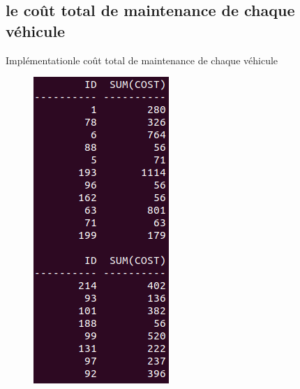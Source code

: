 \documentclass[usenames,dvipsnames]{beamer}
\begin{document}
\subsection{le coût total de maintenance de chaque véhicule}
\begin{frame}{Implémentation}{le coût total de maintenance de chaque véhicule}
\begin{figure}[!ht]
  \centering
  \includegraphics[scale=0.5]{images/requetes_analytiques/requ6.png}
\end{figure}
\end{frame}
\end{document}
